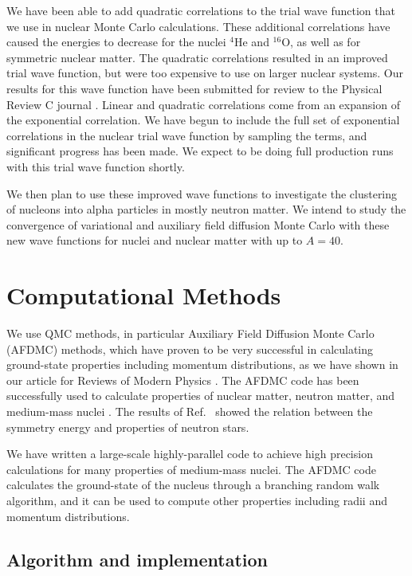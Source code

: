 \documentclass[12pt,letterpaper]{article}
\begin{document}
We have been able to add quadratic correlations to the trial wave function that we use in nuclear Monte Carlo calculations. These additional correlations have caused the energies to decrease for the nuclei $^4$He and $^{16}$O, as well as for symmetric nuclear matter. The quadratic correlations resulted in an improved trial wave function, but were too expensive to use on larger nuclear systems. Our results for this wave function have been submitted for review to the Physical Review C journal \cite{lon18}. Linear and quadratic correlations come from an expansion of the exponential correlation. We have begun to include the full set of exponential correlations in the nuclear trial wave function
by sampling the terms,
and significant progress has been made. We expect to be doing full production runs with this trial wave function shortly.

We then plan to use these improved wave functions to investigate the clustering of nucleons into alpha particles in mostly neutron matter. We intend to study the convergence of variational and auxiliary field diffusion Monte Carlo with these new wave functions for nuclei and nuclear matter with up to $A=40$.

\section{Computational Methods}
\label{sec:comp_met}

We use QMC methods, in particular Auxiliary Field Diffusion Monte Carlo 
(AFDMC) methods, which have proven to be very successful in calculating 
ground-state properties including momentum distributions, as we have shown 
in our article for Reviews of Modern Physics \cite{car15}. The AFDMC code 
has been successfully used to calculate properties of nuclear matter, 
neutron matter, and medium-mass nuclei \cite{gan14}. The results of 
Ref.~\cite{gan12} showed the relation between the symmetry energy and 
properties 
of neutron stars.

We have written a large-scale highly-parallel code to achieve high precision 
calculations for many properties of medium-mass nuclei. The AFDMC code 
calculates the
ground-state of the nucleus through a branching random walk algorithm, and it
can be used to compute other properties including radii and momentum 
distributions.

\subsection{Algorithm and implementation}
\end{document}
